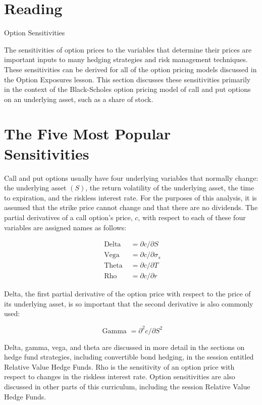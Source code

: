 \documentclass[11pt]{article}
\begin{document}
\section*{Reading}
Option Sensitivities

The sensitivities of option prices to the variables that determine their prices are important inputs to many hedging strategies and risk management techniques. These sensitivities can be derived for all of the option pricing models discussed in the Option Exposures lesson. This section discusses these sensitivities primarily in the context of the Black-Scholes option pricing model of call and put options on an underlying asset, such as a share of stock.

\section*{The Five Most Popular Sensitivities}
Call and put options usually have four underlying variables that normally change: the underlying asset $(S)$, the return volatility of the underlying asset, the time to expiration, and the riskless interest rate. For the purposes of this analysis, it is assumed that the strike price cannot change and that there are no dividends. The partial derivatives of a call option's price, $c$, with respect to each of these four variables are assigned names as follows:

$$
\begin{aligned}
\text { Delta } & =\partial c / \partial S \\
\text { Vega } & =\partial c / \partial \sigma_{s} \\
\text { Theta } & =\partial c / \partial T \\
\text { Rho } & =\partial c / \partial r
\end{aligned}
$$

Delta, the first partial derivative of the option price with respect to the price of its underlying asset, is so important that the second derivative is also commonly used:

$$
\text { Gamma }=\partial^{2} c / \partial S^{2}
$$

Delta, gamma, vega, and theta are discussed in more detail in the sections on hedge fund strategies, including convertible bond hedging, in the session entitled Relative Value Hedge Funds. Rho is the sensitivity of an option price with respect to changes in the riskless interest rate. Option sensitivities are also discussed in other parts of this curriculum, including the session Relative Value Hedge Funds.
\end{document}
